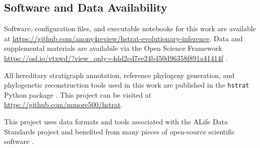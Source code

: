 \subsection{Software and Data Availability}

Software, configuration files, and executable notebooks for this work are available at \url{https://github.com/anony4review/hstrat-evolutionary-inference}.
Data and supplemental materials are availabile via the Open Science Framework \url{https://osf.io/vtxwd/?view_only=4dd2cd7ee24b450d96358f891a41414f} \citep{foster2017open}.

All hereditary stratigraph annotation, reference phylogeny generation, and phylogenetic reconstruction tools used in this work are published in the \texttt{hstrat} Python package  \citep{moreno2022hstrat}. 
This project can be visited at \url{https://github.com/mmore500/hstrat}.

This project uses data formats and tools associated with the ALife Data Standards project \citep{lalejini2019data} and benefited from many pieces of open-source scientific software \cite{ofria2020empirical,sand2014tqdist,2020SciPy-NMeth,harris2020array,reback2020pandas,mckinney-proc-scipy-2010,sukumaran2010dendropy,cock2009biopython}.






